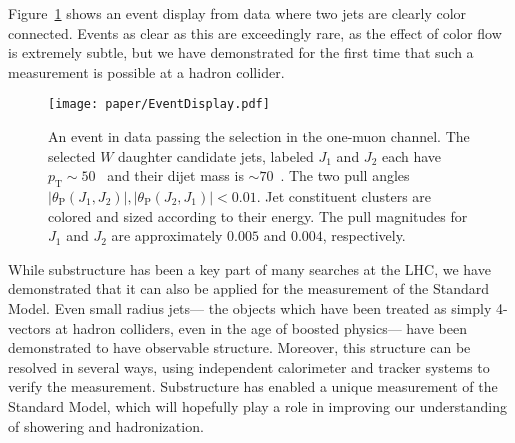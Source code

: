 Figure~\ref{fig:color:eventdisplay} shows an event display from data where two jets are clearly color connected. Events as clear as this are exceedingly rare, as the effect of color flow is extremely subtle, but we have demonstrated for the first time that such a measurement is possible at a hadron collider.


\begin{figure}[htbp]
  \centering
    \texttt{[image: paper/EventDisplay.pdf]}
  \caption{An event in data passing the selection in the one-muon channel.  The selected $W$ daughter candidate jets, labeled $J_1$ and $J_2$ each have $p_\text{T}\sim 50$ \GeV\, and their dijet mass is $\sim 70$ \GeV\,.  The two pull angles $|\theta_\text{P}(J_1,J_2)|,|\theta_\text{P}(J_2,J_1)| < 0.01$.  Jet constituent clusters are colored and sized according to their energy.  The pull magnitudes for $J_1$ and $J_2$ are approximately $0.005$ and $0.004$, respectively.}
  \label{fig:color:eventdisplay}
\end{figure}

While substructure has been a key part of many searches at the LHC, we have demonstrated that it can also be applied for the measurement of the Standard Model. Even small radius jets--- the objects which have been treated as simply 4-vectors at hadron colliders, even in the age of boosted physics--- have been demonstrated to have observable structure. Moreover, this structure can be resolved in several ways, using independent calorimeter and tracker systems to verify the measurement. Substructure has enabled a unique measurement of the Standard Model, which will hopefully play a role in improving our understanding of showering and hadronization.